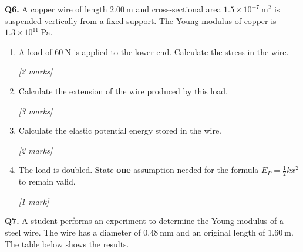 \begin{tcolorbox}[colback=white, colframe=midblue, breakable]

\begin{minipage}{\linewidth}
\textbf{Q6.} A copper wire of length $2.00\ \text{m}$ and cross-sectional area $1.5 \times 10^{-7}\ \text{m}^2$ is suspended vertically from a fixed support. The Young modulus of copper is $1.3 \times 10^{11}\ \text{Pa}$.
\end{minipage}

\begin{enumerate}[label=(\alph*)]
  \item \begin{minipage}[t]{\linewidth}
  A load of $60\ \text{N}$ is applied to the lower end. Calculate the stress in the wire.
  \par\hfill\textit{[2 marks]}
  \vspace{3cm}
  \end{minipage}

  \item \begin{minipage}[t]{\linewidth}
  Calculate the extension of the wire produced by this load.
  \par\hfill\textit{[3 marks]}
  \vspace{3.5cm}
  \end{minipage}

  \item \begin{minipage}[t]{\linewidth}
  Calculate the elastic potential energy stored in the wire.
  \par\hfill\textit{[2 marks]}
  \vspace{3cm}
  \end{minipage}

  \item \begin{minipage}[t]{\linewidth}
  The load is doubled. State \textbf{one} assumption needed for the formula $E_P = \tfrac{1}{2}kx^2$ to remain valid.
  \par\hfill\textit{[1 mark]}
  \vspace{2cm}
  \end{minipage}
\end{enumerate}

\begin{minipage}{\linewidth}
\textbf{Q7.} A student performs an experiment to determine the Young modulus of a steel wire. The wire has a diameter of $0.48\ \text{mm}$ and an original length of $1.60\ \text{m}$. The table below shows the results.


\end{minipage}
\end{tcolorbox}
